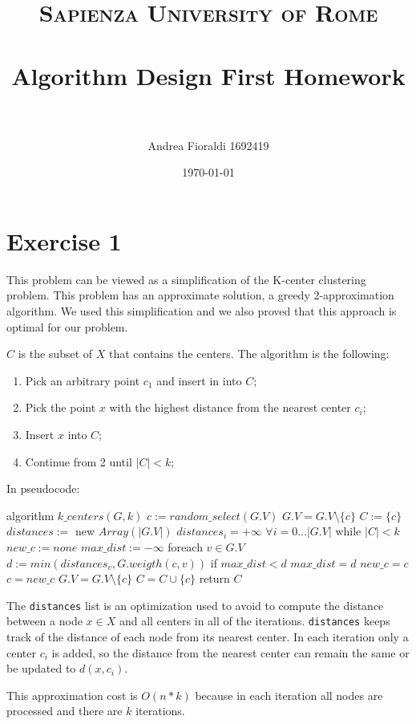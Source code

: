 \documentclass[paper=a4, fontsize=11pt]{scrartcl} %
\title{    
\normalfont \normalsize 
\textsc{Sapienza University of Rome} \\ [25pt] %
\horrule{0.5pt} \\[0.4cm] %
\huge Algorithm Design First Homework \\ %
\horrule{2pt} \\[0.5cm] %
}
\author{Andrea Fioraldi 1692419} %
\date{\normalsize\today} %
\numberwithin{equation}{section} %
\numberwithin{figure}{section} %
\numberwithin{table}{section} %
\begin{document}
\maketitle %

\section*{Exercise 1}

This problem can be viewed as a simplification of the K-center clustering problem. This problem has an approximate solution, a greedy 2-approximation algorithm. We used this simplification and we also proved that this approach is optimal for our problem.

$C$ is the subset of $X$ that contains the centers. The algorithm is the following:

\begin{enumerate}
    \item Pick an arbitrary point $c_1$ and insert in into $C$;
    \item Pick the point $x$ with the highest distance from the nearest center $c_i$;
    \item Insert $x$ into $C$;
    \item Continue from 2 until $|C| < k$;
\end{enumerate}

In pseudocode:

\begin{pseudo}
algorithm $k\_centers(G, k)$
    $c := random\_select(G.V)$
    $G.V = G.V \setminus \{c\}$
    $C := \{c\}$
    $distances :=$ new $Array(|G.V|)$
    $distances_i = +\infty$ $\forall i = 0 ... |G.V|$
    while $|C| < k$
        $new\_c := none$
        $max\_dist := -\infty$
        foreach $v \in G.V$
            $d := min(distances_v, G.weigth(c, v))$
            if $max\_dist < d$
                $max\_dist = d$
                $new\_c = c$
        $c = new\_c$
        $G.V = G.V \setminus \{c\}$
        $C = C \cup \{c\}$
    return $C$
\end{pseudo}


The \verb|distances| list is an optimization used to avoid to compute the distance between a node $x \in X$ and all centers in all of the iterations. \verb|distances| keeps track of the distance of each node from its nearest center. In each iteration only a center $c_i$ is added, so the distance from the nearest center can remain the same or be updated to $d(x, c_i)$.

This approximation cost is $O(n*k)$ because in each iteration all nodes are processed and there are $k$ iterations. 
\end{document}
